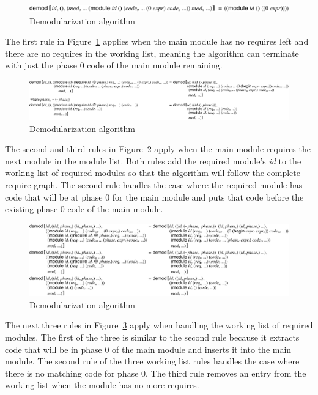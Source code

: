 \begin{figure}[!h]
\includegraphics[width=\textwidth]{figures/demod-redex0}
\caption{Demodularization algorithm}
\label{fig:demod-redex0}
\end{figure}
The first rule in Figure~\ref{fig:demod-redex0} applies when the main module has no requires left and there are no requires in the working list, meaning the algorithm can terminate with just the phase 0 code of the main module remaining.
\begin{figure}[!h]
\includegraphics[width=\textwidth]{figures/demod-redex1}
\caption{Demodularization algorithm}
\label{fig:demod-redex1}
\end{figure}
The second and third rules in Figure~\ref{fig:demod-redex1} apply when the main module requires the next module in the module list.
Both rules add the required module's \emph{id} to the working list of required modules so that the algorithm will follow the complete require graph.
The second rule handles the case where the required module has code that will be at phase 0 for the main module and puts that code before the existing phase 0 code of the main module.
\begin{figure}[!h]
\includegraphics[width=\textwidth]{figures/demod-redex2}
\caption{Demodularization algorithm}
\label{fig:demod-redex2}
\end{figure}
The next three rules in Figure~\ref{fig:demod-redex2} apply when handling the working list of required modules. 
The first of the three is similar to the second rule because it extracts code that will be in phase 0 of the main module and inserts it into the main module.
The second rule of the three working list rules handles the case where there is no matching code for phase 0.
The third rule removes an entry from the working list when the module has no more requires.


